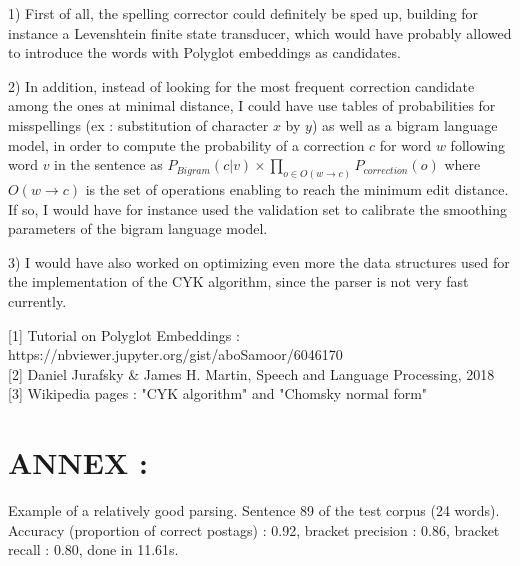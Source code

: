 \documentclass[8pt,twocolumn,letterpaper]{article}
\begin{document}
1) First of all, the spelling corrector could definitely be sped up, building for instance a Levenshtein finite state transducer, which would have probably allowed to introduce the words with Polyglot embeddings as candidates. 

2) In addition, instead of looking for the most frequent correction candidate among the ones at minimal distance, I could have use tables of probabilities for misspellings (ex : substitution of character $x$ by $y$) as well as a bigram language model, in order to compute the probability of a correction $c$ for word $w$ following word $v$ in the sentence as $P_{Bigram}(c|v) \times \prod_{o \in O(w \rightarrow c)} P_{correction}(o)$ where $O(w \rightarrow c)$ is the set of operations enabling to reach the minimum edit distance. If so, I would have for instance used the validation set to calibrate the smoothing parameters of the bigram language model. 

3) I would have also worked on optimizing even more the data structures used for the implementation of the CYK algorithm, since the parser is not very fast currently.

\begin{thebibliography}{5}  

[1] Tutorial on Polyglot Embeddings : https://nbviewer.jupyter.org/gist/aboSamoor/6046170 \\

[2] Daniel Jurafsky & James H. Martin, Speech and Language Processing, 2018 \\

[3] Wikipedia pages : "CYK algorithm" and "Chomsky normal form"

\end{thebibliography}

\onecolumn


\section*{ANNEX :} Example of a relatively good parsing. Sentence 89 of the test corpus (24 words). \\ Accuracy (proportion of correct postags) : 0.92, bracket precision : 0.86, bracket recall : 0.80, done in 11.61s.
\end{document}
